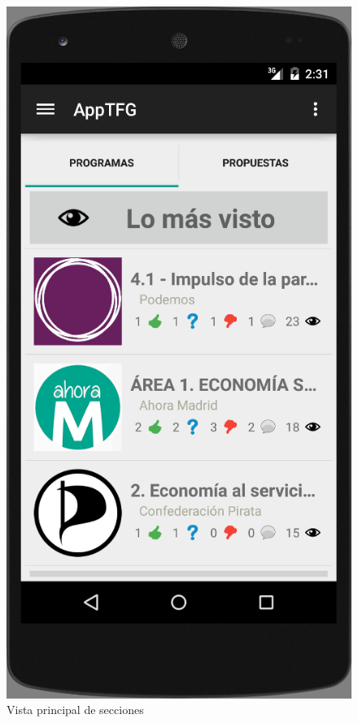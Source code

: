 	\begin{figure}[H]
      \centering
	\includegraphics[keepaspectratio, scale=0.5]{Media/Captures/captTopSections.png}
      \caption{Vista principal de secciones}
      \label{fig:captTopSections}
    \end{figure}
    
